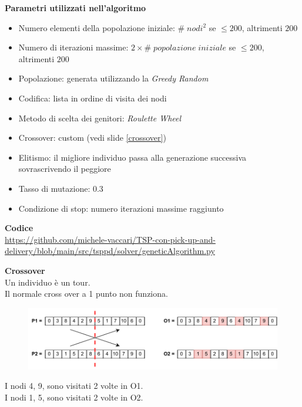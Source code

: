 \documentclass[9pt]{beamer}
\begin{document}
\begin{frame}[allowframebreaks]{\subsecname}
	\textbf{Parametri utilizzati nell'algoritmo}
	\begin{itemize}
		\item
		Numero elementi della popolazione iniziale: $\#\;nodi^2$ se $\leq 200$, altrimenti $200$
		\item
		Numero di iterazioni massime: $2 \times \#\;popolazione\;iniziale$ se $\leq 200$, altrimenti $200$
		\item
		Popolazione: generata utilizzando la \emph{Greedy Random}
		\item
		Codifica: lista in ordine di visita dei nodi
		\item
		Metodo di scelta dei genitori: \emph{Roulette Wheel}
		\item
		Crossover: custom (vedi slide \ref{crossover})
		\item
		Elitismo: il migliore individuo passa alla generazione successiva sovrascrivendo il peggiore
		\item
		Tasso di mutazione: 0.3
		\item
		Condizione di stop: numero iterazioni massime raggiunto
	\end{itemize}

	\textbf{Codice} \\
	\href{https://github.com/michele-vaccari/TSP-con-pick-up-and-delivery/blob/main/src/tsppd/solver/geneticAlgorithm.py}{https://github.com/michele-vaccari/TSP-con-pick-up-and-delivery/blob/main/src/tsppd/solver/geneticAlgorithm.py}

\framebreak \label{crossover}
	
	\textbf{Crossover} \\
 	Un individuo è un tour. \\
	Il normale cross over a 1 punto non funziona.

      	\begin{figure}[h]
	\centering
	\includegraphics[width=\textwidth]
	{../images/crossover-1a}
	\end{figure}

	I nodi 4, 9, sono visitati 2 volte in O1. \\
	I nodi 1, 5, sono visitati 2 volte in O2.


\end{frame}
\end{document}
